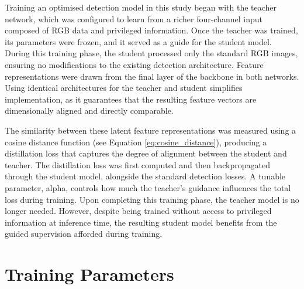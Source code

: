 Training an optimised detection model in this study began with the teacher network, which was configured to learn from a richer four-channel input composed of RGB data and privileged information. Once the teacher was trained, its parameters were frozen, and it served as a guide for the student model. During this training phase, the student processed only the standard RGB images, ensuring no modifications to the existing detection architecture. Feature representations were drawn from the final layer of the backbone in both networks. Using identical architectures for the teacher and student simplifies implementation, as it guarantees that the resulting feature vectors are dimensionally aligned and directly comparable.

The similarity between these latent feature representations was measured using a cosine distance function (see Equation \ref{eq:cosine_distance}), producing a distillation loss that captures the degree of alignment between the student and teacher. The distillation loss was first computed and then backpropagated through the student model, alongside the standard detection losses. A tunable parameter, \gls{alpha}, controls how much the teacher’s guidance influences the total loss during training. Upon completing this training phase, the teacher model is no longer needed. However, despite being trained without access to privileged information at inference time, the resulting student model benefits from the guided supervision afforded during training.

\section{Training Parameters}
\label{sec:4_training_params}

